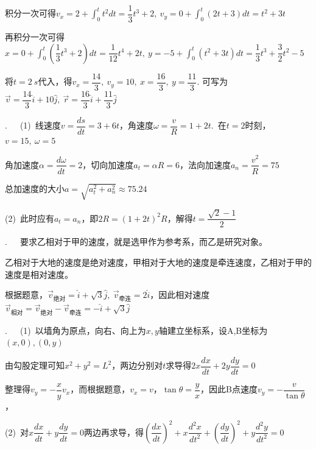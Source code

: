 积分一次可得$v_x=2+\displaystyle \int_0^t{t^2dt}=\dfrac{1}{3}t^3+2,~v_y=0+\displaystyle \int_0^t{(2t+3)dt}=t^2+3t$

\vspace{0.5em}

再积分一次可得$x=0+\displaystyle \int_0^t{\left(\dfrac{1}{3}t^3+2\right)dt}=\dfrac{1}{12}t^4+2t,~y=-5+\displaystyle \int_0^t{(t^2+3t)dt}=\dfrac{1}{3}t^3+\dfrac{3}{2}t^2-5$

\vspace{0.5em}

将$t=\SI{2}{s}$代入，得$v_x=\dfrac{14}{3},~v_y=10,~x=\dfrac{16}{3},~y=\dfrac{11}{3}$. 可写为$\vec{v}=\dfrac{14}{3}\hat{i}+10\hat{j},~\vec{r}=\dfrac{16}{3}\hat{i}+\dfrac{11}{3}\hat{j}$

\noindent\hdashrule{\textwidth}{1pt}{1pt}

.~~~(1)~线速度$v=\dfrac{ds}{dt}=3+6t$，角速度$\omega=\dfrac{v}{R}=1+2t$.~在$t=2$时刻，$v=15,~\omega=5$

角加速度$\alpha=\dfrac{d\omega}{dt}=2$，切向加速度$a_t=\alpha R=6$，法向加速度$a_n=\dfrac{v^2}{R}=75$

总加速度的大小$a=\sqrt{a_t^2+a_n^2}\approx 75.24$

(2)~此时应有$a_t=a_n$，即$2R=(1+2t)^2 R$，解得$t=\dfrac{\sqrt{2}-1}{2}$


.~~~要求乙相对于甲的速度，就是选甲作为参考系，而乙是研究对象。

乙相对于大地的速度是绝对速度，甲相对于大地的速度是牵连速度，乙相对于甲的速度是相对速度。

根据题意，$\vec{v}_{\text{绝对}}=\hat{i}+\sqrt{3}\hat{j},~\vec{v}_{\text{牵连}}=2\hat{i}$，因此相对速度$\vec{v}_{\text{相对}}=\vec{v}_{\text{绝对}}-\vec{v}_{\text{牵连}}=-\hat{i}+\sqrt{3}\hat{j}$

\noindent\hdashrule{\textwidth}{1pt}{1pt}

.~~~(1)~以墙角为原点，向右、向上为$x,y$轴建立坐标系，设A,B坐标为$(x,0),(0,y)$

由勾股定理可知$x^2+y^2=L^2$，两边分别对$t$求导得$2x\dfrac{dx}{dt}+2y\dfrac{dy}{dt}=0$

整理得$v_y=-\dfrac{x}{y}v_x$，而根据题意，$v_x=v$，$\tan{\theta}=\dfrac{y}{x}$，因此B点速度$v_y=-\dfrac{v}{\tan{\theta}}$，

(2)~对$x\dfrac{dx}{dt}+y\dfrac{dy}{dt}=0$两边再求导，得$\left(\dfrac{dx}{dt}\right)^2+x\dfrac{d^2x}{dt^2}+\left(\dfrac{dy}{dt}\right)^2+y\dfrac{d^2y}{dt^2}=0$

